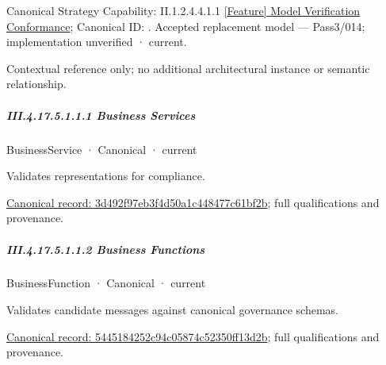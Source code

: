 {\small Canonical Strategy Capability: II.1.2.4.4.1.1 \hyperref[element:89e8a277738845cbb768e8685e8e2d56]{[Feature] Model Verification Conformance}; Canonical ID: \texttt{}. Accepted replacement model — Pass3/014; implementation unverified · current.}\par
Contextual reference only; no additional architectural instance or semantic relationship.\par
\subparagraph*{III.4.17.5.1.1.1 Business Services}
\label{navigation:III.4.17.5.1.1.1}

\label{navigation:III.4.17.5.1.1.1.1}

\label{element:3d492f97eb3f4d50a1c448477c61bf2b}
{\small BusinessService · Canonical · current}\par

Validates representations for compliance.


{\footnotesize \href{../../../../../../../../continuum/business/business-service/3d492f97eb3f4d50a1c448477c61bf2b.md}{Canonical record: 3d492f97eb3f4d50a1c448477c61bf2b}; full qualifications and provenance.}\par
\subparagraph*{III.4.17.5.1.1.2 Business Functions}
\label{navigation:III.4.17.5.1.1.2}

\label{navigation:III.4.17.5.1.1.2.1}

\label{element:5445184252c94c05874c52350ff13d2b}
{\small BusinessFunction · Canonical · current}\par

Validates candidate messages against canonical governance schemas.


{\footnotesize \href{../../../../../../../../continuum/business/business-function/5445184252c94c05874c52350ff13d2b.md}{Canonical record: 5445184252c94c05874c52350ff13d2b}; full qualifications and provenance.}\par
